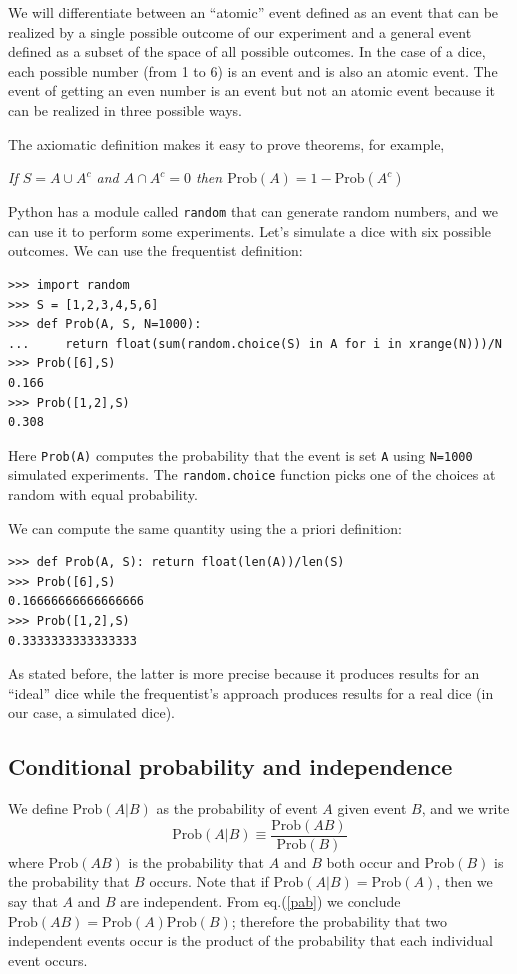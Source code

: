 \documentclass[justified,sixbynine]{tufte-book}
\def\ft{\small\tt}
\theoremstyle{plain}%
\theoremstyle{definition}
\theoremstyle{remark}
\begin{document}
\begin{fullwidth}
We will differentiate between an ``atomic'' event defined as an event that
can be realized by a single possible outcome of our experiment and a general
event defined as a subset of the space of all possible outcomes. In the case
of a dice, each possible number (from 1 to 6) is an event and is also an
atomic event. The event of getting an even number is an event but not an
atomic event because it can be realized in three possible ways.

The axiomatic definition makes it easy to prove theorems, for example,

{\it If $S=A\cup A^c$ and $A\cap A^c=0$ then $\textrm{Prob}(A)=1-\textrm{Prob}(A^c)$}

Python has a module called {\ft random} that can generate random numbers, and we can use it to perform some experiments.
Let's simulate a dice with six possible outcomes.
We can use the frequentist definition:

\begin{lstlisting}[caption={in file: {\ft nlib.py}}]
>>> import random
>>> S = [1,2,3,4,5,6]
>>> def Prob(A, S, N=1000):
...     return float(sum(random.choice(S) in A for i in xrange(N)))/N
>>> Prob([6],S)
0.166
>>> Prob([1,2],S)
0.308
\end{lstlisting}
Here {\ft \textrm{Prob}(A)} computes the probability that the event is set {\ft A} using {\ft N=1000} simulated experiments.
The {\ft random.choice} function picks one of the choices at random with equal probability.

We can compute the same quantity using the a priori definition:

\begin{lstlisting}[caption={in file: {\ft nlib.py}}]
>>> def Prob(A, S): return float(len(A))/len(S)
>>> Prob([6],S)
0.16666666666666666
>>> Prob([1,2],S)
0.3333333333333333
\end{lstlisting}

As stated before, the latter is more precise because it produces results for an ``ideal'' dice while the frequentist's approach produces results for a real dice (in our case, a simulated dice).

\goodbreak\subsection{Conditional probability and independence}

We define $\textrm{Prob}(A|B)$ as the probability of event $A$ given event $B$, and we
write
\begin{equation}
\textrm{Prob}(A|B)\equiv \frac{\textrm{Prob}(AB)}{\textrm{Prob}(B)}  \label{pab}
\end{equation}
where $\textrm{Prob}(AB)$ is the probability that $A$ and $B$ both occur and $\textrm{Prob}(B)$ is
the probability that $B$ occurs. Note that if $\textrm{Prob}(A|B)=\textrm{Prob}(A)$, then we say
that $A$ and $B$ are independent. From eq.(\ref{pab})
we conclude $\textrm{Prob}(AB)=\textrm{Prob}(A)\textrm{Prob}(B)$; therefore the probability that two
independent events occur is the product of the probability that each individual event
occurs.


\end{fullwidth}
\end{document}

